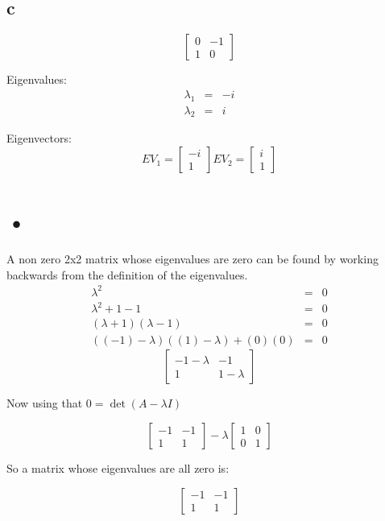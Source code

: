 \documentclass[12pt]{article}
\begin{document}
\subsection*{c}

\[
\begin{bmatrix}
0 & -1\\
1 & 0
\end{bmatrix}
\]

Eigenvalues:
\begin{eqnarray*}
\lambda_1 &=& -i\\
\lambda_2 &=& i
\end{eqnarray*}

Eigenvectors:
\[EV_1 =
\begin{bmatrix}
-i\\
1
\end{bmatrix}
EV_2 =
\begin{bmatrix}
i\\
1
\end{bmatrix}
\]

\section{•}

A non zero 2x2 matrix whose eigenvalues are zero can be found by working backwards from the definition of the eigenvalues.
\begin{eqnarray*}
\lambda^2 &=& 0\\
\lambda^2 + 1 - 1 &=& 0\\
(\lambda +1) (\lambda -1) &=& 0\\
((-1)-\lambda) ((1) -\lambda) + (0)(0) &=& 0
\end{eqnarray*}
\[
\begin{bmatrix}
-1-\lambda & -1\\
1 & 1 - \lambda
\end{bmatrix}
\]

Now using that $0= \det (A-\lambda I)$

\[
\begin{bmatrix}
-1 & -1\\
1 & 1
\end{bmatrix}
-
\lambda
\begin{bmatrix}
1 & 0\\
0 & 1
\end{bmatrix}
\]

So a matrix whose eigenvalues are all zero is:

\[
\begin{bmatrix}
-1 & -1\\
1 & 1
\end{bmatrix}
\]
\end{document}
